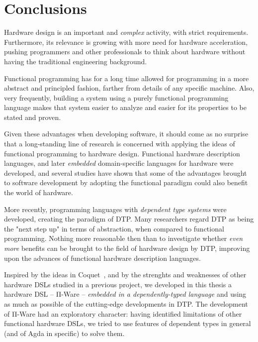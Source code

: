 \chapter{Conclusions}
\label{chap:conclusions}

    Hardware design is an important and \emph{complex} activity, with strict requirements.
    Furthermore, its relevance is growing with more need for hardware acceleration,
    pushing programmers and other professionals to think about hardware without having
    the traditional engineering background.

    Functional programming has for a long time allowed for programming in a more
    abstract and principled fashion, farther from details of any specific machine.
    Also, very frequently, building a system using a purely functional programming language
    makes that system easier to analyze and easier for its properties to be stated and proven.

    Given these advantages when developing software, it should come as no surprise that
    a long-standing line of research is concerned with applying the ideas of functional
    programming to hardware design.
    Functional hardware description languages, and later
    \emph{embedded} domain-specific languages for hardware were developed,
    and several studies have shown that some of the advantages brought to software development
    by adopting the functional paradigm could also benefit the world of hardware.

    More recently, programming languages with \emph{dependent type systems} were developed,
    creating the paradigm of \acf{DTP}.
    Many researchers regard \ac{DTP} as being the "next step up" in terms of abstraction,
    when compared to functional programming.
    Nothing more reasonable then than to investigate whether \emph{even more} benefits
    can be brought to the field of hardware design by \ac{DTP},
    improving upon the advances of functional hardware description languages.

    Inspired by the ideas in Coquet~\cite{coquet2011}, and by the strenghts and weaknesses of other
    hardware \acp{DSL} studied in a previous project, we developed in this thesis
    a hardware \ac{DSL} – Π-Ware – \emph{embedded in a dependently-typed language} and using
    as much as possible of the cutting-edge developments in \ac{DTP}.
    The development of Π-Ware had an exploratory character: having identified limitations of
    other functional hardware \acp{DSL}, we tried to use features of dependent types in general
    (and of Agda in specific) to solve them.

